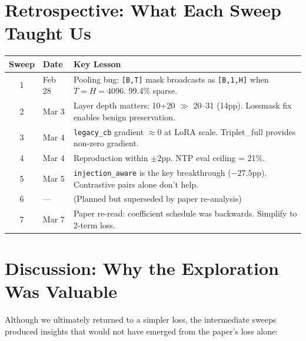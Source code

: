 \documentclass[11pt]{article}
\newcommand{\good}[1]{\textcolor{good}{#1}}
\newcommand{\note}[1]{\textcolor{note}{#1}}
\begin{document}
\section{Retrospective: What Each Sweep Taught Us}

\begin{center}
\small
\begin{tabular}{clp{8cm}}
\toprule
Sweep & Date & Key Lesson \\
\midrule
1 & Feb 28 & Pooling bug: \texttt{[B,T]} mask broadcasts as \texttt{[B,1,H]} when $T=H=4096$. 99.4\% sparse. \\
2 & Mar 3 & Layer depth matters: 10+20 \good{$\gg$} 20--31 (14pp). Lossmask fix enables benign preservation. \\
3 & Mar 4 & \texttt{legacy\_cb} gradient $\approx 0$ at LoRA scale. Triplet\_full provides non-zero gradient. \\
4 & Mar 4 & Reproduction within $\pm 2$pp. NTP eval ceiling = 21\%. \\
5 & Mar 5 & \texttt{injection\_aware} is the key breakthrough ($-27.5$pp). Contrastive pairs alone don't help. \\
6 & --- & (Planned but superseded by paper re-analysis) \\
7 & Mar 7 & \note{Paper re-read: coefficient schedule was backwards. Simplify to 2-term loss.} \\
\bottomrule
\end{tabular}
\end{center}

\section{Discussion: Why the Exploration Was Valuable}

Although we ultimately returned to a simpler loss, the intermediate sweeps
produced insights that would not have emerged from the paper's loss alone:
\end{document}
